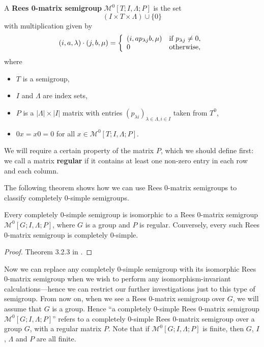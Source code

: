 \begin{definition}
  \label{def:rzms}
  A \textbf{Rees 0-matrix semigroup} $\mathcal{M}^0[T;I,\Lambda;P]$ is the set
  $$(I \times T \times \Lambda) \cup \{0\}$$
  with multiplication given by
  $$(i,a,\lambda) \cdot (j,b,\mu) = \left\{
    \begin{array}{l l}
      (i,ap_{\lambda j}b, \mu) & \text{if~} p_{\lambda j} \neq 0, \\
      0 & \text{otherwise,}
    \end{array}
  \right.$$
  where
  \begin{itemize}
  \item $T$ is a semigroup,
  \item $I$ and $\Lambda$ are index sets,
  \item $P$ is a $|\Lambda| \times |I|$ matrix with entries $(p_{\lambda
      i})_{\lambda \in \Lambda, i \in I}$
    taken from $T^0$,
  \item $0x=x0=0$ for all $x \in \mathcal{M}^0[T;I,\Lambda;P]$.
  \end{itemize}
\end{definition}

We will require a certain property of the matrix $P$, which we should define
first: we call a matrix \textbf{regular} if it contains at least one
non-zero entry in each row and each column.

The following theorem shows how we can use Rees 0-matrix semigroups to classify
completely 0-simple semigroups.

\begin{theorem}[Rees]
  \label{thm:rees}
  Every completely 0-simple semigroup is isomorphic to a Rees 0-matrix semigroup
  $\mathcal{M}^0[G;I,\Lambda;P]$, where $G$ is a group and $P$ is regular.
  Conversely, every such Rees 0-matrix semigroup is completely 0-simple.
  \begin{proof}
    Theorem 3.2.3 in \cite{howie}.
  \end{proof}
\end{theorem}

Now we can replace any completely 0-simple semigroup with its isomorphic Rees
0-matrix semigroup when we wish to perform any isomorphism-invariant
calculations---hence we can restrict our further investigations just to this
type of semigroup.  From now on, when we see a Rees 0-matrix semigroup over $G$,
we will assume that $G$ is a group.  Hence ``a completely 0-simple Rees 0-matrix
semigroup $\mathcal{M}^0[G;I,\Lambda;P]$'' refers to a completely 0-simple Rees
0-matrix semigroup over a group $G$, with a regular matrix $P$.  Note that if
$\mathcal{M}^0[G;I,\Lambda;P]$ is finite, then $G$, $I$, $\Lambda$ and $P$ are
all finite.

